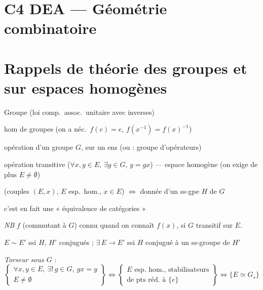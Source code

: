 \documentclass[11pt,a4paper]{article}
\begin{document}
\section*{C4 DEA — Géométrie combinatoire}


\section*{Rappels de théorie des groupes et sur espaces homogènes}

Groupe (loi comp.\ assoc.\ unitaire avec inverses)

hom de groupes (on a néc.\ $f(e) = e$, $f(x^{-1}) = f(x)^{-1}$)

opération d'un groupe $G$, sur un ens (ou : groupe d'opérateurs)

opération transitive ($\forall x, y \in E$, $\exists g \in G$, $y = gx$) —
espace homogène (on exige de plus $E \neq \emptyset$)

(couples $(E, x)$, $E$ esp.\ hom., $x \in E$) $\Longleftrightarrow$ donnée d'un
ss-gpe $H$ de $G$

c'est en fait une « équivalence de catégories »


\emph{NB} $f$ (commutant à $G$) connu quand on connaît $f(x)$, si $G$
transitif sur $E$.

$E \sim E'$ ssi $H$, $H'$ conjugués ; $\exists\, E \to E'$ ssi $H$ conjugué à un
ss-groupe de $H'$


\emph{Torseur sous $G$} :
\[
  \left\{
  \begin{array}{l}
    \forall x, y \in E,\ \exists !\, g \in G,\ gx = y \\
    E \neq \emptyset
  \end{array}
  \right\}
  \Longleftrightarrow
  \left\{
  \begin{array}{l}
    E \text{ esp. hom., stabilisateurs} \\
    \text{de pts réd. à } \{e\}
  \end{array}
  \right\}
  \Longleftrightarrow
  \{ E \simeq G_s \}
\]
\end{document}

